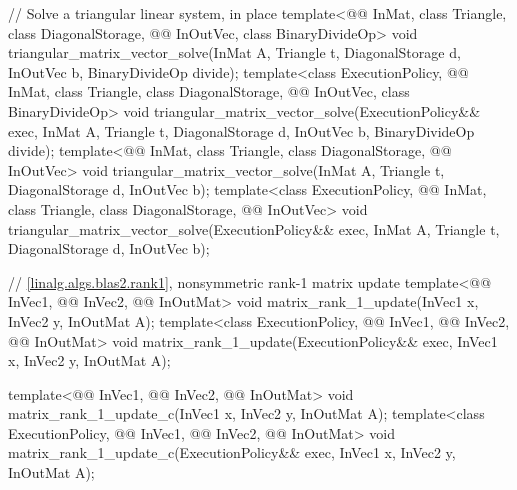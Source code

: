 \begin{codeblock}
{  // Solve a triangular linear system, in place
  template<@@ InMat, class Triangle, class DiagonalStorage,
           @@ InOutVec, class BinaryDivideOp>
    void triangular_matrix_vector_solve(InMat A, Triangle t, DiagonalStorage d,
                                        InOutVec b, BinaryDivideOp divide);
  template<class ExecutionPolicy, @@ InMat, class Triangle, class DiagonalStorage,
           @@ InOutVec, class BinaryDivideOp>
    void triangular_matrix_vector_solve(ExecutionPolicy&& exec,
                                        InMat A, Triangle t, DiagonalStorage d,
                                        InOutVec b, BinaryDivideOp divide);
  template<@@ InMat, class Triangle, class DiagonalStorage, @@ InOutVec>
    void triangular_matrix_vector_solve(InMat A, Triangle t, DiagonalStorage d, InOutVec b);
  template<class ExecutionPolicy,
           @@ InMat, class Triangle, class DiagonalStorage, @@ InOutVec>
    void triangular_matrix_vector_solve(ExecutionPolicy&& exec,
                                        InMat A, Triangle t, DiagonalStorage d, InOutVec b);

  // \ref{linalg.algs.blas2.rank1}, nonsymmetric rank-1 matrix update
  template<@@ InVec1, @@ InVec2, @@ InOutMat>
    void matrix_rank_1_update(InVec1 x, InVec2 y, InOutMat A);
  template<class ExecutionPolicy, @@ InVec1, @@ InVec2, @@ InOutMat>
    void matrix_rank_1_update(ExecutionPolicy&& exec,
                              InVec1 x, InVec2 y, InOutMat A);

  template<@@ InVec1, @@ InVec2, @@ InOutMat>
    void matrix_rank_1_update_c(InVec1 x, InVec2 y, InOutMat A);
  template<class ExecutionPolicy, @@ InVec1, @@ InVec2, @@ InOutMat>
    void matrix_rank_1_update_c(ExecutionPolicy&& exec,
                                InVec1 x, InVec2 y, InOutMat A);

}
\end{codeblock}
